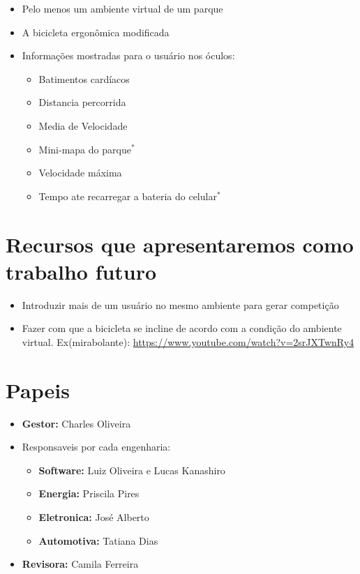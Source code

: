 \begin{itemize}
	\item Pelo menos um ambiente virtual de um parque
	\item A bicicleta ergonômica modificada
	\item Informações mostradas para o usuário nos óculos:
	\begin{itemize}
		\item Batimentos cardíacos
		\item Distancia percorrida
		\item Media de Velocidade
		\item Mini-mapa do parque$^*$
		\item Velocidade máxima
		\item Tempo ate recarregar a bateria do celular$^*$
	\end{itemize}
\end{itemize}

\section{Recursos que apresentaremos como trabalho futuro}

\begin{itemize}
	\item Introduzir mais de um usuário no mesmo ambiente para gerar competição
	\item Fazer com que a bicicleta se incline de acordo com a condição do ambiente virtual. Ex(mirabolante): \url{https://www.youtube.com/watch?v=2srJXTwnRy4}
\end{itemize}


\section{Papeis}

\begin{itemize}
	\item \textbf{Gestor:} Charles Oliveira
	\item Responsaveis por cada engenharia:
	\begin{itemize}
		\item 	\textbf{Software:} Luiz Oliveira e Lucas Kanashiro
		\item 	\textbf{Energia:} Priscila Pires
		\item 	\textbf{Eletronica:} José Alberto
		\item 	\textbf{Automotiva:} Tatiana Dias
\end{itemize}
\item \textbf{Revisora:} Camila Ferreira

\end{itemize}